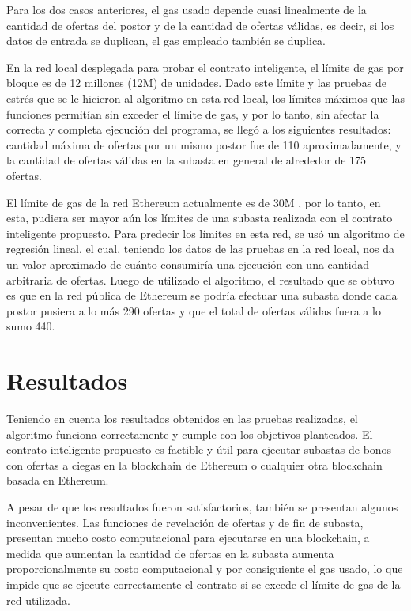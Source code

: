   
        Para los dos casos anteriores, el gas usado depende cuasi linealmente de la cantidad de ofertas del 
        postor y de la cantidad de ofertas válidas, es decir, si los datos de entrada se duplican, el gas 
        empleado también se duplica.
  
  
        En la red local desplegada para probar el contrato inteligente, el límite de gas por bloque es de 
        12 millones (12M) de unidades. Dado este límite y las pruebas de estrés que se le hicieron al 
        algoritmo en esta red local, los límites máximos que las funciones permitían sin exceder el límite
        de gas, y por lo tanto, sin afectar la correcta y completa ejecución del programa, se llegó a los
        siguientes resultados: cantidad máxima de ofertas por un mismo postor fue de 110 aproximadamente,
        y la cantidad de ofertas válidas en la subasta en general de alrededor de 175 ofertas.
  
  
        El límite de gas de la red Ethereum actualmente es de 30M \parencite{ycharts}, por lo tanto, en esta,
        pudiera ser mayor aún los límites de una subasta realizada con el contrato inteligente propuesto.
        Para predecir los límites en esta red, se usó un algoritmo de regresión lineal, el cual, teniendo 
        los datos de las pruebas en la red local, nos da un valor aproximado de cuánto consumiría una 
        ejecución con una cantidad arbitraria de ofertas. Luego de utilizado el algoritmo, el resultado que 
        se obtuvo es que en la red pública de Ethereum se podría efectuar una subasta donde cada postor 
        pusiera a lo más 290 ofertas y que el total de ofertas válidas fuera a lo sumo 440.

    \section{Resultados}
      Teniendo en cuenta los resultados obtenidos en las pruebas realizadas, el algoritmo funciona 
      correctamente y cumple con los objetivos planteados. El contrato inteligente propuesto es factible y 
      útil para ejecutar
      subastas de bonos con ofertas a ciegas en la blockchain de Ethereum o cualquier otra blockchain 
      basada en Ethereum.
  
  
      A pesar de que los resultados fueron satisfactorios, también se presentan algunos inconvenientes.
      Las funciones de revelación de ofertas y de fin de subasta, presentan mucho costo computacional para 
      ejecutarse en una blockchain, a medida que aumentan la cantidad de ofertas en la subasta aumenta 
      proporcionalmente 
      su costo computacional y por consiguiente el gas usado, lo que impide que se ejecute correctamente el contrato
      si se excede el límite de gas de la red utilizada.
  
